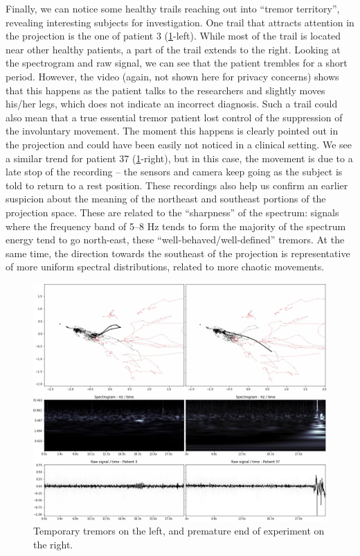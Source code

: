 Finally, we can notice some healthy trails reaching out into ``tremor territory'', revealing interesting subjects for investigation. One trail that attracts attention in the projection is the one of patient 3 (\cref{fig:exp1-337}-left). While most of the trail is located near other healthy patients, a part of the trail extends to the right. Looking at the spectrogram and raw signal, we can see that the patient trembles for a short period. However, the video (again, not shown here for privacy concerns) shows that this happens as the patient talks to the researchers and slightly moves his/her legs, which does not indicate an incorrect diagnosis.
Such a trail could also mean that a true essential tremor patient lost control of the suppression of the involuntary movement. The moment this happens is clearly pointed out in the projection and could have been easily not noticed in a clinical setting. We see a similar trend for patient 37 (\cref{fig:exp1-337}-right), but in this case, the movement is due to a late stop of the recording -- the sensors and camera keep going as the subject is told to return to a rest position. These recordings also help us confirm an earlier suspicion about the meaning of the northeast and southeast portions of the projection space. These are related to the ``sharpness'' of the spectrum: signals where the frequency band of 5--8 Hz tends to form the majority of the spectrum energy tend to go north-east, these ``well-behaved/well-defined'' tremors. At the same time, the direction towards the southeast of the projection is representative of more uniform spectral distributions, related to more chaotic movements.

\begin{figure}[ht]
\centering
\includegraphics[width=\linewidth]{figures/nemo/exp1-337.png}
\caption{Temporary tremors on the left, and premature end of experiment on the right.}
\label{fig:exp1-337}
\end{figure}

